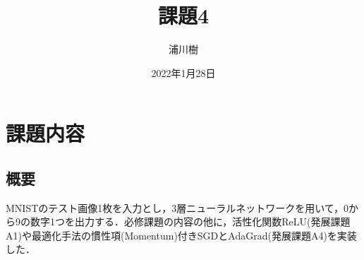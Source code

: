 \documentclass[uplatex]{jsarticle}
\begin{document}
    \title{課題4}
    \author{浦川樹}
    \date{2022年1月28日}
    \maketitle

    \section{課題内容}

    \subsection{概要}
    MNISTのテスト画像1枚を入力とし，3層ニューラルネットワークを用いて，0から9の数字1つを出力する．必修課題の内容の他に，活性化関数ReLU(発展課題A1)や最適化手法の慣性項(Momentum)付きSGDとAdaGrad(発展課題A4)を実装した．
\end{document}
